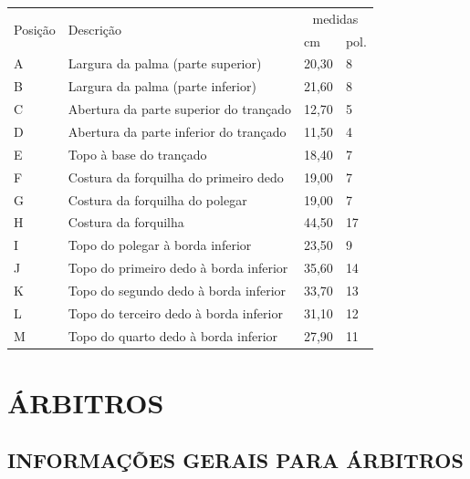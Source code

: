 	\begin{tabular}{llll}\hline
	\multirow{2}{*}{Posição} &
	\multirow{2}{*}{Descrição}&
	\multicolumn{2}{c}{medidas}\\
	&&cm & pol.\\\hline
	A& Largura da palma (parte superior)&20,30&8\\\hline
	B& Largura da palma (parte inferior)&21,60&8 \textonehalf \\\hline
	C& Abertura da parte superior do trançado&12,70&5 \\\hline
	D&  Abertura da parte inferior do trançado&11,50&4 \textonehalf \\\hline
	E&  Topo à base do trançado&18,40&7 \textonequarter{}  \\\hline
	F&  Costura da forquilha do primeiro dedo&19,00&7 \textonehalf \\\hline
	G&  Costura da forquilha do polegar&19,00&7 \textonehalf \\\hline
	H&  Costura da forquilha&44,50&17 \textonehalf \\\hline
	I&  Topo do polegar à borda inferior&23,50&9 \textonequarter{} \\\hline
	J&  Topo do primeiro dedo à borda inferior&35,60&14\\\hline
	K&   Topo do segundo dedo à borda inferior&33,70&13 \textonequarter{} \\\hline
	L&  Topo do terceiro dedo à borda inferior&31,10&12 \textonequarter{} \\\hline
	M& Topo do quarto dedo à borda inferior&27,90&11 \\\hline

\end{tabular}















\chapter{ÁRBITROS}
\minitoc%

\section{INFORMAÇÕES GERAIS PARA ÁRBITROS}

